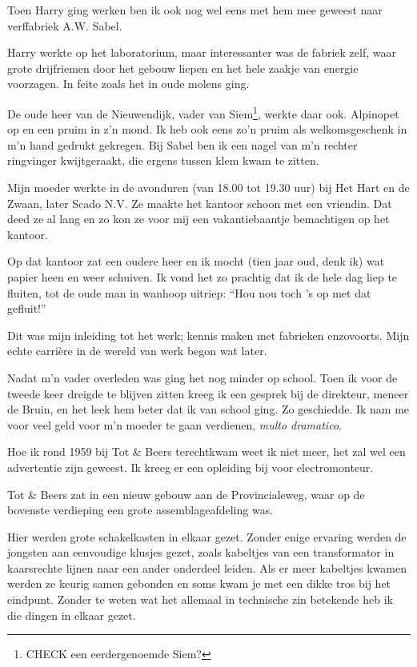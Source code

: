 \documentclass[12pt,twoside]{memoir}
\begin{document}

Toen Harry ging werken ben ik ook nog wel eens met hem mee geweest naar verffabriek A.W. Sabel. 

Harry werkte op het laboratorium, maar interessanter was de fabriek zelf, waar grote drijfriemen door het gebouw liepen en het hele zaakje van energie voorzagen. In feite zoals het in oude molens ging.

De oude heer van de Nieuwendijk, vader van Siem\footnote{CHECK een eerdergenoemde Siem?}, werkte daar ook. Alpinopet op en een pruim in z’n mond. Ik heb ook eens zo’n pruim als welkomsgeschenk in m’n hand gedrukt gekregen. Bij Sabel ben ik een nagel van m’n rechter ringvinger kwijtgeraakt, die ergens tussen klem kwam te zitten.

Mijn moeder werkte in de avonduren (van 18.00 tot 19.30 uur) bij Het Hart en de Zwaan, later Scado N.V. Ze maakte het kantoor schoon met een vriendin. Dat deed ze al lang en zo kon ze voor mij een vakantiebaantje bemachtigen op het kantoor. 

Op dat kantoor zat een oudere heer en ik mocht (tien jaar oud, denk ik) wat papier heen en weer schuiven. Ik vond het zo prachtig dat ik de hele dag liep te fluiten, tot de oude man in wanhoop uitriep: ``Hou nou toch ’s op met dat gefluit!''

Dit was mijn inleiding tot het werk; kennis maken met fabrieken enzovoorts. Mijn echte carrière in de wereld van werk begon wat later.

Nadat m’n vader overleden was ging het nog minder op school. Toen ik voor de tweede keer dreigde te blijven zitten kreeg ik een gesprek bij de direkteur, meneer de Bruin, en het leek hem beter dat ik van school ging. Zo geschiedde. Ik nam me voor veel geld voor m’n moeder te gaan verdienen, \emph{multo dramatico}.

Hoe ik rond 1959 bij Tot \& Beers terechtkwam weet ik niet meer, het zal wel een advertentie zijn geweest. Ik kreeg er een opleiding bij voor electromonteur.

Tot \& Beers zat in een nieuw gebouw aan de Provincialeweg, waar op de bovenste verdieping een grote assemblageafdeling was. 

Hier werden grote schakelkasten in elkaar gezet. Zonder enige ervaring werden de jongsten aan eenvoudige klusjes gezet, zoals kabeltjes van een transformator in kaarsrechte lijnen naar een ander onderdeel leiden. Als er meer kabeltjes kwamen werden ze keurig samen gebonden en soms kwam je met een dikke tros bij het eindpunt. Zonder te weten wat het allemaal in technische zin betekende heb ik die dingen in elkaar gezet. 
\end{document}
